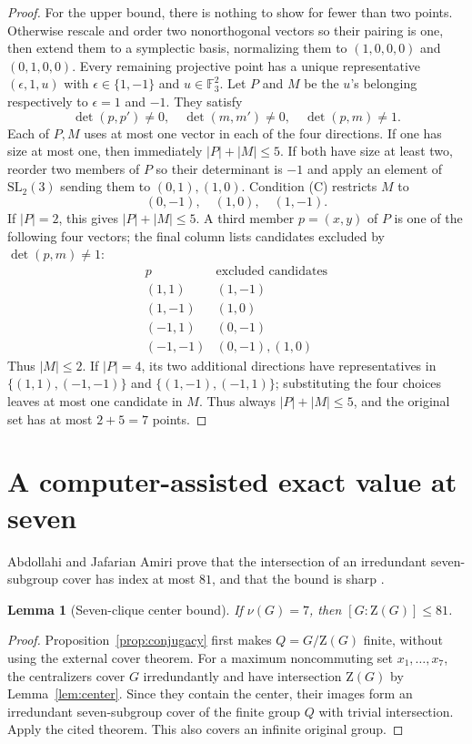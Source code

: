 \documentclass[11pt]{article}
\newtheorem{lemma}[theorem]{Lemma}
\theoremstyle{remark}
\newcommand{\nuG}{\nu}
\newcommand{\F}{\mathbb F}
\newcommand{\Z}{\mathrm Z}
\begin{document}
\begin{proof}
For the upper bound, there is nothing to show for fewer than two points.
Otherwise rescale and order two nonorthogonal vectors so their pairing is
one, then extend them to a symplectic basis, normalizing them to
$(1,0,0,0)$ and $(0,1,0,0)$.
Every remaining projective point has a unique representative
$(\epsilon,1,u)$ with $\epsilon\in\{1,-1\}$ and $u\in\F_3^2$.  Let $P$ and
$M$ be the $u$'s belonging respectively to $\epsilon=1$ and $-1$.  They
satisfy
\[
 \det(p,p')\ne0,\quad\det(m,m')\ne0,\quad\det(p,m)\ne1.\tag{C}
\]
Each of $P,M$ uses at most one vector in each of the four directions.  If
one has size at most one, then immediately $|P|+|M|\le5$. If both have size
at least two, reorder two members of $P$ so their determinant is $-1$ and
apply an element of $\mathrm{SL}_2(3)$ sending them to
$(0,1),(1,0)$. Condition (C) restricts $M$ to
\[
 (0,-1),\quad(1,0),\quad(1,-1).
\]
If $|P|=2$, this gives $|P|+|M|\le5$. A third member $p=(x,y)$ of $P$ is
one of the following four vectors; the final column lists candidates
excluded by $\det(p,m)\ne1$:
\[
\begin{array}{c|c}
p&\text{excluded candidates}\\ \hline
(1,1)&(1,-1)\\
(1,-1)&(1,0)\\
(-1,1)&(0,-1)\\
(-1,-1)&(0,-1),(1,0)
\end{array}
\]
Thus $|M|\le2$. If $|P|=4$, its two additional directions have
representatives in $\{(1,1),(-1,-1)\}$ and
$\{(1,-1),(-1,1)\}$; substituting the four choices leaves at most one
candidate in $M$.  Thus always $|P|+|M|\le5$, and the original set has at
most $2+5=7$ points.
\end{proof}

\section{A computer-assisted exact value at seven}

Abdollahi and Jafarian Amiri prove that the intersection of an irredundant
seven-subgroup cover has index at most $81$, and that the bound is sharp
\cite[Theorem~B, p.~292; proof pp.~299--300]
{abdollahi_jafarian_amiri_2007_seven_cover}.

\begin{lemma}[Seven-clique center bound]\label{lem:index-seven}
If $\nuG(G)=7$, then $[G:\Z(G)]\le81$.
\end{lemma}

\begin{proof}
Proposition~\ref{prop:conjugacy} first makes $Q=G/\Z(G)$ finite, without
using the external cover theorem.  For a maximum noncommuting set
$x_1,\ldots,x_7$, the centralizers cover $G$ irredundantly and have
intersection $\Z(G)$ by Lemma~\ref{lem:center}.  Since they contain the
center, their images form an irredundant seven-subgroup cover of the finite
group $Q$ with trivial intersection.  Apply the cited theorem.  This also
covers an infinite original group.
\end{proof}
\end{document}
